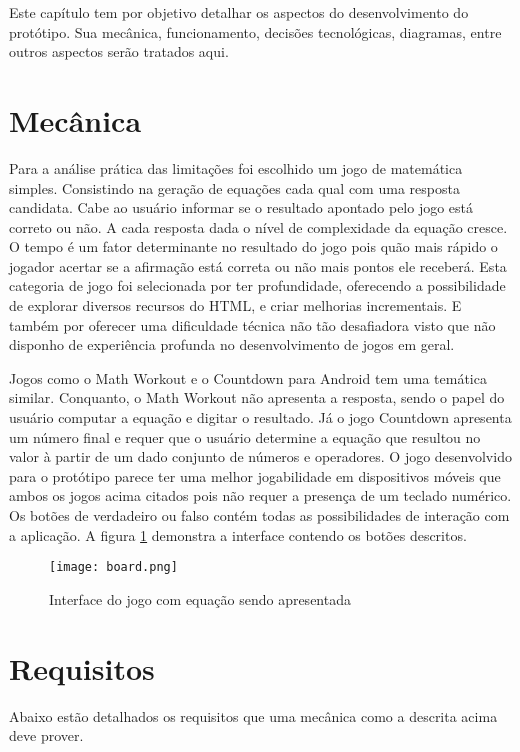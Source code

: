 Este capítulo tem por objetivo detalhar os aspectos do desenvolvimento
do protótipo. Sua mecânica, funcionamento, decisões tecnológicas,
diagramas, entre outros aspectos serão tratados aqui.

\section{Mecânica}

Para a análise prática das limitações foi escolhido um jogo de
matemática simples. Consistindo na geração de equações cada qual 
com uma resposta candidata. Cabe ao usuário informar se o resultado apontado
pelo jogo está correto ou não. A cada resposta dada o nível de
complexidade da equação cresce. O tempo é um fator determinante
no resultado do jogo pois quão mais rápido o jogador acertar se a
afirmação está correta ou não mais pontos ele receberá. Esta
categoria de jogo foi selecionada por ter profundidade, oferecendo a
possibilidade de explorar diversos recursos do HTML, e criar melhorias
incrementais. E também por oferecer uma dificuldade técnica não
tão desafiadora visto que não disponho de experiência profunda no
desenvolvimento de jogos em geral.

Jogos como o Math Workout e o Countdown para Android tem uma temática
similar. Conquanto, o Math Workout não apresenta a resposta, sendo o
papel do usuário computar a equação e digitar o resultado. Já o jogo
Countdown apresenta um número final e requer que o usuário determine
a equação que resultou no valor à partir de um dado conjunto de
números e operadores. O jogo desenvolvido para o protótipo parece ter
uma melhor jogabilidade em dispositivos móveis que ambos os jogos acima
citados pois não requer a presença de um teclado numérico. Os botões
de verdadeiro ou falso contém todas as possibilidades de interação
com a aplicação. A figura \ref{fig:gameScreen} demonstra a interface
contendo os botões descritos.

\begin{figure}[H]
    \centering
    \texttt{[image: board.png]}
	\caption{Interface do jogo com equação sendo apresentada}
    \label{fig:gameScreen}
\end{figure}

\section{Requisitos}

Abaixo estão detalhados os requisitos que uma mecânica como a descrita
acima deve prover.

